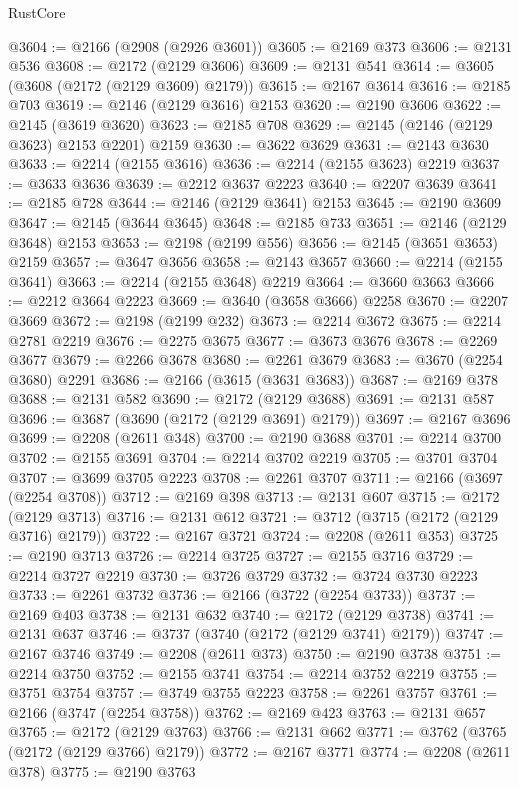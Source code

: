 \begin{lexlean}{RustCore}
\begin{coremodule}
@3604 := @2166 (@2908 (@2926 @3601))
@3605 := @2169 @373
@3606 := @2131 @536
@3608 := @2172 (@2129 @3606)
@3609 := @2131 @541
@3614 := @3605 (@3608 (@2172 (@2129 @3609) @2179))
@3615 := @2167 @3614
@3616 := @2185 @703
@3619 := @2146 (@2129 @3616) @2153
@3620 := @2190 @3606
@3622 := @2145 (@3619 @3620)
@3623 := @2185 @708
@3629 := @2145 (@2146 (@2129 @3623) @2153 @2201) @2159
@3630 := @3622 @3629
@3631 := @2143 @3630
@3633 := @2214 (@2155 @3616)
@3636 := @2214 (@2155 @3623) @2219
@3637 := @3633 @3636
@3639 := @2212 @3637 @2223
@3640 := @2207 @3639
@3641 := @2185 @728
@3644 := @2146 (@2129 @3641) @2153
@3645 := @2190 @3609
@3647 := @2145 (@3644 @3645)
@3648 := @2185 @733
@3651 := @2146 (@2129 @3648) @2153
@3653 := @2198 (@2199 @556)
@3656 := @2145 (@3651 @3653) @2159
@3657 := @3647 @3656
@3658 := @2143 @3657
@3660 := @2214 (@2155 @3641)
@3663 := @2214 (@2155 @3648) @2219
@3664 := @3660 @3663
@3666 := @2212 @3664 @2223
@3669 := @3640 (@3658 @3666) @2258
@3670 := @2207 @3669
@3672 := @2198 (@2199 @232)
@3673 := @2214 @3672
@3675 := @2214 @2781 @2219
@3676 := @2275 @3675
@3677 := @3673 @3676
@3678 := @2269 @3677
@3679 := @2266 @3678
@3680 := @2261 @3679
@3683 := @3670 (@2254 @3680) @2291
@3686 := @2166 (@3615 (@3631 @3683))
@3687 := @2169 @378
@3688 := @2131 @582
@3690 := @2172 (@2129 @3688)
@3691 := @2131 @587
@3696 := @3687 (@3690 (@2172 (@2129 @3691) @2179))
@3697 := @2167 @3696
@3699 := @2208 (@2611 @348)
@3700 := @2190 @3688
@3701 := @2214 @3700
@3702 := @2155 @3691
@3704 := @2214 @3702 @2219
@3705 := @3701 @3704
@3707 := @3699 @3705 @2223
@3708 := @2261 @3707
@3711 := @2166 (@3697 (@2254 @3708))
@3712 := @2169 @398
@3713 := @2131 @607
@3715 := @2172 (@2129 @3713)
@3716 := @2131 @612
@3721 := @3712 (@3715 (@2172 (@2129 @3716) @2179))
@3722 := @2167 @3721
@3724 := @2208 (@2611 @353)
@3725 := @2190 @3713
@3726 := @2214 @3725
@3727 := @2155 @3716
@3729 := @2214 @3727 @2219
@3730 := @3726 @3729
@3732 := @3724 @3730 @2223
@3733 := @2261 @3732
@3736 := @2166 (@3722 (@2254 @3733))
@3737 := @2169 @403
@3738 := @2131 @632
@3740 := @2172 (@2129 @3738)
@3741 := @2131 @637
@3746 := @3737 (@3740 (@2172 (@2129 @3741) @2179))
@3747 := @2167 @3746
@3749 := @2208 (@2611 @373)
@3750 := @2190 @3738
@3751 := @2214 @3750
@3752 := @2155 @3741
@3754 := @2214 @3752 @2219
@3755 := @3751 @3754
@3757 := @3749 @3755 @2223
@3758 := @2261 @3757
@3761 := @2166 (@3747 (@2254 @3758))
@3762 := @2169 @423
@3763 := @2131 @657
@3765 := @2172 (@2129 @3763)
@3766 := @2131 @662
@3771 := @3762 (@3765 (@2172 (@2129 @3766) @2179))
@3772 := @2167 @3771
@3774 := @2208 (@2611 @378)
@3775 := @2190 @3763

\end{coremodule}
\end{lexlean}
